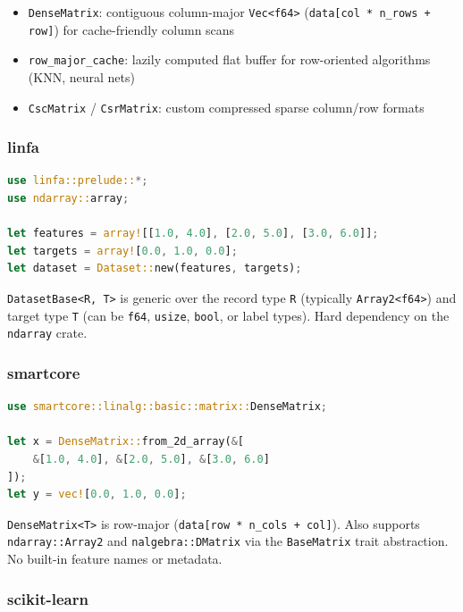 \documentclass[11pt,a4paper]{article}
\begin{document}
\begin{itemize}[itemsep=2pt]
\item \texttt{DenseMatrix}: contiguous column-major \texttt{Vec<f64>} (\texttt{data[col * n\_rows + row]}) for cache-friendly column scans
\item \texttt{row\_major\_cache}: lazily computed flat buffer for row-oriented algorithms (KNN, neural nets)
\item \texttt{CscMatrix} / \texttt{CsrMatrix}: custom compressed sparse column/row formats
\end{itemize}

\subsubsection*{linfa}

\begin{lstlisting}[language=Rust]
use linfa::prelude::*;
use ndarray::array;

let features = array![[1.0, 4.0], [2.0, 5.0], [3.0, 6.0]];
let targets = array![0.0, 1.0, 0.0];
let dataset = Dataset::new(features, targets);
\end{lstlisting}

\texttt{DatasetBase<R, T>} is generic over the record type \texttt{R} (typically \texttt{Array2<f64>}) and target type \texttt{T} (can be \texttt{f64}, \texttt{usize}, \texttt{bool}, or label types). Hard dependency on the \texttt{ndarray} crate.

\subsubsection*{smartcore}

\begin{lstlisting}[language=Rust]
use smartcore::linalg::basic::matrix::DenseMatrix;

let x = DenseMatrix::from_2d_array(&[
    &[1.0, 4.0], &[2.0, 5.0], &[3.0, 6.0]
]);
let y = vec![0.0, 1.0, 0.0];
\end{lstlisting}

\texttt{DenseMatrix<T>} is row-major (\texttt{data[row * n\_cols + col]}). Also supports \texttt{ndarray::Array2} and \texttt{nalgebra::DMatrix} via the \texttt{BaseMatrix} trait abstraction. No built-in feature names or metadata.

\subsubsection*{scikit-learn}
\end{document}
